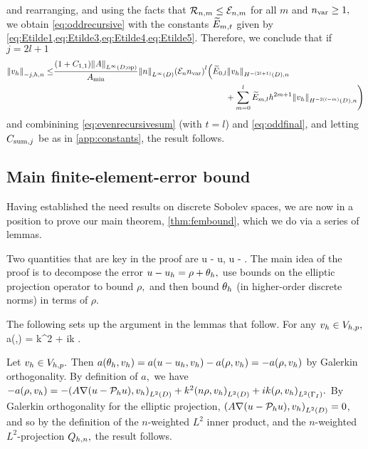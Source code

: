 and rearranging, and using the facts that $\mathcal R_{n,m} \leq \mathcal E_{n,m}$ for all $m$ and $n_{\mathrm{var}} \geq 1,$ we obtain \cref{eq:oddrecursive} with the constants $\widetilde{E}_{m,t}$ given by \cref{eq:Etilde1,eq:Etilde3,eq:Etilde4,eq:Etilde5}. Therefore, we conclude that if $j = 2l+1$
\begin{align}
\Nfn{-j,h,n}{\vh} \leq& \frac{\mleft(1+\Cfn{1,1}\mright)\NLiDop{A}}{\Amin}\NLiD{n}\mleft(\En \nvar\mright)^{l}\mleft(\Etildefn{0,l} \NHnfn{-(2l+1)}{D}{\vh}\mright.\nonumber\\
&\mleft.\hphantom{\frac{\mleft(1+\Cfn{1,1}\mright)\NLiDop{A}}{\Amin}\NLiD{n}\mleft(\En \nvar\mright)^{l}}
\quad\quad+ \sum_{m=0}^{l} \Etildefn{m,l} h^{2m+1}  \NHnfn{-2(l-m)}{D}{\vh}\mright)\label{eq:oddfinal}
\end{align}
and combinining \cref{eq:evenrecursivesum} (with $t=l$) and \cref{eq:oddfinal}, and letting $C_{\mathrm{sum},j}$ be as in \cref{app:constants}, the result follows.%
\epf

\subsection{Main finite-element-error bound}\label{sec:fembound}

Having established the need results on discrete Sobolev spaces, we are now in a position to prove our main theorem, \cref{thm:fembound}, which we do via a series of lemmas.

Two quantities that are key in the proof are
\beqs
\rho \de u - \Ph u, \tand
\eeqs
\beqs
\thetah \de \Ph u - \uh.
\eeqs
The main idea of the proof is to decompose the error $u - u_{h} = \rho + \theta_{h},$ use bounds on the elliptic projection operator to bound $\rho,$ and then bound $\theta_{h}$ (in higher-order discrete norms) in terms of $\rho.$

The following  sets up the argument in the lemmas that follow.
\label{lem:simpleform}
For any $v_{h} \in V_{h,p},$
\beq\label{eq:thetaform}
a(\thetah,\vh) = k^2\IPLtDn{\Qhn\rho}{\vh} + ik \IPLtGI{\rho}{\vh}.
\eeq
\ele

Let $v_{h} \in V_{h,p}.$ Then $a(\theta_{h},v_{h}) = a(u-u_{h},v_{h}) - a(\rho,v_{h}) = -a(\rho,v_{h})$ by Galerkin orthogonality. By definition of $a,$ we have $-a(\rho,\vh) = -\IPLtD{A\grad\mleft(u-\Ph u\mright)}{\vh} + k^2 \IPLtD{n\rho}{\vh} + ik\IPLtGI{\rho}{\vh}.$ By Galerkin orthogonality for the elliptic projection, $\IPLtD{A\grad\mleft(u-\Ph u\mright)}{\vh} = 0$, and so by the definition of the $n$-weighted $L^2$ inner product, and the $n$-weighted $L^2$-projection $Q_{h,n},$ the result follows.
\epf

